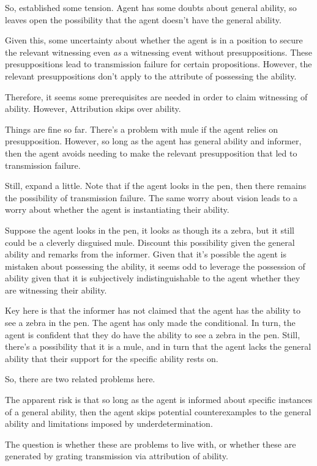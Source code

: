 \documentclass[10pt]{article}
\newcommand{\AR}[0]{\textsf{Attribution}}
\newcommand{\hozlinedash}[0]{%
  \noindent\hdashrule[0.5ex][c]{\textwidth}{.1pt}{2.5pt}
}
\begin{document}
\begin{note}
  So, established some tension.
  Agent has some doubts about general ability, so leaves open the possibility that the agent doesn't have the general ability.

  Given this, some uncertainty about whether the agent is in a position to secure the relevant witnessing even \emph{as} a witnessing event without presuppositions.
  These presuppositions lead to transmission failure for certain propositions.
  However, the relevant presuppositions don't apply to the attribute of possessing the ability.

  Therefore, it seems some prerequisites are needed in order to claim witnessing of ability.
  However, \AR{} skips over ability.

  
\end{note}


\hozlinedash

\begin{note}[Hum]
  Things are fine so far.
  There's a problem with mule if the agent relies on presupposition.
  However, so long as the agent has general ability and informer, then the agent avoids needing to make the relevant presupposition that led to transmission failure.

  Still, expand a little.
  Note that if the agent looks in the pen, then there remains the possibility of transmission failure.
  The same worry about vision leads to a worry about whether the agent is instantiating their ability.

  Suppose the agent looks in the pen, it looks as though its a zebra, but it still could be a cleverly disguised mule.
  Discount this possibility given the general ability and remarks from the informer.
  Given that it's possible the agent is mistaken about possessing the ability, it seems odd to leverage the possession of ability given that it is subjectively indistinguishable to the agent whether they are witnessing their ability.

  Key here is that the informer has not claimed that the agent has the ability to see a zebra in the pen.
  The agent has only made the conditional.
  In turn, the agent is confident that they do have the ability to see a zebra in the pen.
  Still, there's a possibility that it is a mule, and in turn that the agent lacks the general ability that their support for the specific ability rests on.

  So, there are two related problems here.

  The apparent risk is that so long as the agent is informed about specific instances of a general ability, then the agent skips potential counterexamples to the general ability and limitations imposed by underdetermination.

  The question is whether these are problems to live with, or whether these are generated by grating transmission via attribution of ability.
\end{note}
\end{document}
